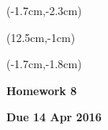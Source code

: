 \documentclass[12pt, oneside]{article}
\begin{document}


\begin{textblock*}{4cm}(-1.7cm,-2.3cm)
\end{textblock*}

\begin{textblock*}{8cm}(12.5cm,-1cm)
\end{textblock*}
\begin{textblock*}{13.5cm}(-1.7cm,-1.8cm)
\end{textblock*}

\vspace{1cm}

\begin{center}
\textbf{\Large Homework 8}

\textbf{Due 14 Apr 2016}
\end{center}
\end{document}
